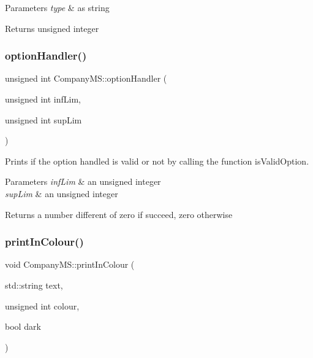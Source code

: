\begin{DoxyParams}{Parameters}
{\em type} & as string \\
\hline
\end{DoxyParams}
\begin{DoxyReturn}{Returns}
unsigned integer 
\end{DoxyReturn}
\mbox{\label{class_company_m_s_a91f5627674f301e51beb79eb6827e4d9}} 
\subsubsection{\texorpdfstring{option\+Handler()}{optionHandler()}}
{\footnotesize\ttfamily unsigned int Company\+M\+S\+::option\+Handler (\begin{DoxyParamCaption}\item[{unsigned int}]{inf\+Lim,  }\item[{unsigned int}]{sup\+Lim }\end{DoxyParamCaption})}



Prints if the option handled is valid or not by calling the function is\+Valid\+Option. 


\begin{DoxyParams}{Parameters}
{\em inf\+Lim} & an unsigned integer \\
\hline
{\em sup\+Lim} & an unsigned integer \\
\hline
\end{DoxyParams}
\begin{DoxyReturn}{Returns}
a number different of zero if succeed, zero otherwise 
\end{DoxyReturn}
\mbox{\label{class_company_m_s_add31caead466fc75331b5ec7300ad718}} 
\subsubsection{\texorpdfstring{print\+In\+Colour()}{printInColour()}}
{\footnotesize\ttfamily void Company\+M\+S\+::print\+In\+Colour (\begin{DoxyParamCaption}\item[{std\+::string}]{text,  }\item[{unsigned int}]{colour,  }\item[{bool}]{dark }\end{DoxyParamCaption})}


